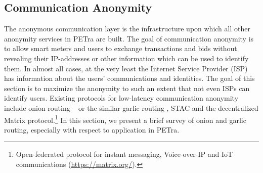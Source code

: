 

\subsection{Communication Anonymity}
\label{comm} 
The anonymous communication layer is the infrastructure upon which all
other anonymity services in PETra are built.  The goal of communication anonymity is to allow smart meters and users to exchange transactions and bids without revealing their IP-addresses or other information which can be used to identify them. In almost all cases, at the very least the Internet Service Provider (ISP) has information about the users' communications and identities. The goal of this section is to maximize the anonymity to such an extent that not even ISPs can identify users. Existing protocols for low-latency communication anonymity include onion routing ~\cite{reed1998anonymous} or the similar garlic routing \cite{Liu2014EmpiricalMA}, STAC \cite{7986314} and the decentralized Matrix protocol.\footnote{Open-federated protocol for instant messaging, Voice-over-IP and IoT communications (\url{https://matrix.org/}).} In this section, we present a brief survey of onion and garlic routing, especially with respect to application in PETra.

 
